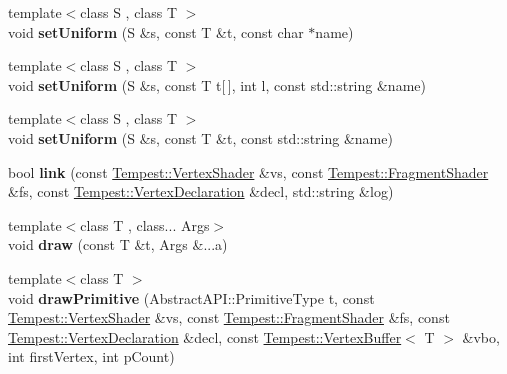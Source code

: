 \begin{DoxyCompactItemize}
\item 
\hypertarget{class_tempest_1_1_device_a894211c24a232a3787b6f542847eef7b}{{\footnotesize template$<$class S , class T $>$ }\\void {\bfseries set\+Uniform} (S \&s, const T \&t, const char $\ast$name)}\label{class_tempest_1_1_device_a894211c24a232a3787b6f542847eef7b}

\item 
\hypertarget{class_tempest_1_1_device_ad10aa7ee16ebb951d38e7818dd4850d4}{{\footnotesize template$<$class S , class T $>$ }\\void {\bfseries set\+Uniform} (S \&s, const T t\mbox{[}$\,$\mbox{]}, int l, const std\+::string \&name)}\label{class_tempest_1_1_device_ad10aa7ee16ebb951d38e7818dd4850d4}

\item 
\hypertarget{class_tempest_1_1_device_a6d7c1247d6739f258dbe40e7873a02b6}{{\footnotesize template$<$class S , class T $>$ }\\void {\bfseries set\+Uniform} (S \&s, const T \&t, const std\+::string \&name)}\label{class_tempest_1_1_device_a6d7c1247d6739f258dbe40e7873a02b6}

\item 
\hypertarget{class_tempest_1_1_device_a8f5f15026b870f3bbb7b1969f968b58c}{bool {\bfseries link} (const \hyperlink{class_tempest_1_1_vertex_shader}{Tempest\+::\+Vertex\+Shader} \&vs, const \hyperlink{class_tempest_1_1_fragment_shader}{Tempest\+::\+Fragment\+Shader} \&fs, const \hyperlink{class_tempest_1_1_vertex_declaration}{Tempest\+::\+Vertex\+Declaration} \&decl, std\+::string \&log)}\label{class_tempest_1_1_device_a8f5f15026b870f3bbb7b1969f968b58c}

\item 
\hypertarget{class_tempest_1_1_device_a17d39961995d0826d7a4c8705dc9b7ef}{{\footnotesize template$<$class T , class... Args$>$ }\\void {\bfseries draw} (const T \&t, Args \&...a)}\label{class_tempest_1_1_device_a17d39961995d0826d7a4c8705dc9b7ef}

\item 
\hypertarget{class_tempest_1_1_device_aa8186bd4b01a02a520443380c5a762ad}{{\footnotesize template$<$class T $>$ }\\void {\bfseries draw\+Primitive} (Abstract\+A\+P\+I\+::\+Primitive\+Type t, const \hyperlink{class_tempest_1_1_vertex_shader}{Tempest\+::\+Vertex\+Shader} \&vs, const \hyperlink{class_tempest_1_1_fragment_shader}{Tempest\+::\+Fragment\+Shader} \&fs, const \hyperlink{class_tempest_1_1_vertex_declaration}{Tempest\+::\+Vertex\+Declaration} \&decl, const \hyperlink{class_tempest_1_1_vertex_buffer}{Tempest\+::\+Vertex\+Buffer}$<$ T $>$ \&vbo, int first\+Vertex, int p\+Count)}\label{class_tempest_1_1_device_aa8186bd4b01a02a520443380c5a762ad}


\end{DoxyCompactItemize}
